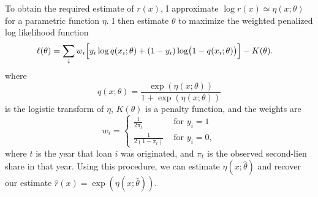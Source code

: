 \documentclass[letterpaper,12pt,usenames,dvipsnames]{article}
\newcommand{\bigpbrac}[1]{\bigl( #1 \bigr)}
\newcommand{\Bigsbrac}[1]{\Bigl[ #1 \Bigr]}
\newcommand{\todo}[1]{\ifcomments{\color{red} [#1]}\fi}
\theoremstyle{definition}
\begin{document}
To obtain the required estimate of $r(x)$, I approximate $\log r(x) \simeq \eta(x; \theta)$ for a parametric function $\eta$. I then estimate $\theta$ to maximize the weighted penalized log likelihood function
\begin{align}
	\label{eq:likelihood-q}
	\ell(\theta) &= \sum_i w_i \Bigsbrac{ y_i \log q(x_i; \theta) + (1 - y_i) \log \bigpbrac{1 - q(x_i; \theta)}} - K(\theta).
\end{align}
where
\begin{equation}
	q(x; \theta) = \frac{\exp(\eta(x; \theta))}{1 + \exp(\eta(x; \theta))}
\end{equation}
is the logistic transform of $\eta$, $K(\theta)$ is a penalty function, and the weights are
\begin{equation}
	w_i = \begin{cases}
		\frac{1}{2 \pi_t} &\text{ for } y_i = 1 \\
		\frac{1}{2 (1 - \pi_t)} &\text{ for } y_i = 0,
	\end{cases}
	\label{eq:weights}
\end{equation}
where $t$ is the year that loan $i$ was originated, and $\pi_t$ is the observed second-lien share in that year.
Using this procedure, we can estimate $\eta(x; \hat{\theta})$ and recover our estimate $\hat{r}(x) = \exp(\eta(x; \hat{\theta}))$.
\end{document}
